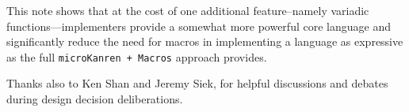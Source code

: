 \documentclass[sigplan,screen,draft,anonymous,review,natbib=false]{acmart}
\begin{document}
This note shows that at the cost of one additional feature--namely
variadic functions---implementers provide a somewhat more powerful
core language and significantly reduce the need for macros in
implementing a language as expressive as the full
\verb|microKanren + Macros| approach provides.

\begin{acks}

Thanks also to Ken Shan and Jeremy Siek, for helpful discussions and
debates during design decision deliberations.

\end{acks}

\printbibliography{}
\end{document}
